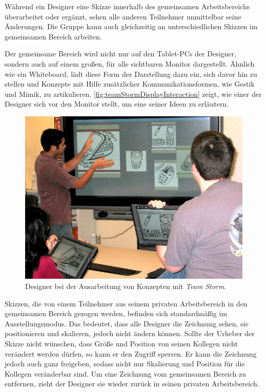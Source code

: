 Während ein Designer eine Skizze innerhalb des gemeinsamen Arbeitsbereichs überarbeitet oder ergänzt, sehen alle anderen Teilnehmer unmittelbar seine Änderungen. Die Gruppe kann auch gleichzeitig an unterschiedlichen Skizzen im gemeinsamen Bereich arbeiten.

Der gemeinsame Bereich wird nicht nur auf den Tablet-PCs der Designer, sondern auch auf einem großen, für alle sichtbaren Monitor dargestellt. Ähnlich wie ein Whiteboard, lädt diese Form der Darstellung dazu ein, sich davor hin zu stellen und Konzepte mit Hilfe zusätzlicher Kommunikationsformen, wie Gestik und Mimik, zu artikulieren. \autoref{fig:teamStormDisplayInteraction} zeigt, wie einer der Designer sich vor den Monitor stellt, um eine seiner Ideen zu erläutern.\\

\begin{figure}[bth]
	\includegraphics[width=\linewidth]{gfx/teamStormDisplayInteraction.png}
	\caption{Designer bei der Ausarbeitung von Konzepten mit \emph{Team Storm}.}
	\label{fig:teamStormDisplayInteraction}
\end{figure}

Skizzen, die von einem Teilnehmer aus seinem privaten Arbeitsbereich in den gemeinsamen Bereich gezogen werden, befinden sich standardmäßig im Ausstellungsmodus. Das bedeutet, dass alle Designer die Zeichnung sehen, sie positionieren und skalieren, jedoch nicht ändern können. Sollte der Urheber der Skizze nicht wünschen, dass Größe und Position von seinen Kollegen nicht verändert werden dürfen, so kann er den Zugriff sperren. Er kann die Zeichnung jedoch auch ganz freigeben, sodass nicht nur Skalierung und Position für die Kollegen veränderbar sind. Um eine Zeichnung vom gemeinsamen Bereich zu entfernen, zieht der Designer sie wieder zurück in seinen privaten Arbeitsbereich.

